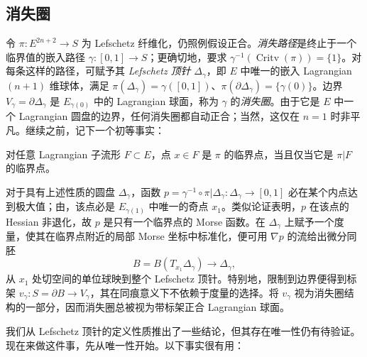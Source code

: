 \subsection{消失圈}\label{sec:16b}
令 $\pi:E^{2n+2}\to S$ 为 Lefschetz 纤维化，仍照例假设正合。\emph{消失路径}是终止于一个临界值的嵌入路径 $\gamma:[0,1]\to S$；更确切地，要求 $\gamma^{-1}(\operatorname{Critv}(\pi))=\{1\}$。对每条这样的路径，可赋予其 \emph{Lefschetz 顶针} $\Delta_\gamma$，即 $E$ 中唯一的嵌入 Lagrangian $(n+1)$ 维球体，满足 $\pi(\Delta_\gamma)=\gamma([0,1])$、$\pi(\partial\Delta_\gamma)=\{\gamma(0)\}$。边界 $V_\gamma=\partial\Delta_\gamma$ 是 $E_{\gamma(0)}$ 中的 Lagrangian 球面，称为 $\gamma$ 的\emph{消失圈}。由于它是 $E$ 中一个 Lagrangian 圆盘的边界，任何消失圈都自动正合；当然，这仅在 $n=1$ 时非平凡。继续之前，记下一个初等事实：

\begin{lemma}\label{st:16.2}
对任意 Lagrangian 子流形 $F\subset E$，点 $x\in F$ 是 $\pi$ 的临界点，当且仅当它是 $\pi|F$ 的临界点。
\end{lemma}

对于具有上述性质的圆盘 $\Delta_\gamma$，函数 $p=\gamma^{-1}\circ\pi|\Delta_\gamma:\Delta_\gamma\to[0,1]$ 必在某个内点达到极大值；由，该点必是 $E_{\gamma(1)}$ 中唯一的奇点 $x_1$。类似论证表明，$p$ 在该点的 Hessian 非退化，故 $p$ 是只有一个临界点的 Morse 函数。在 $\Delta_\gamma$ 上赋予一个度量，使其在临界点附近的局部 Morse 坐标中标准化，便可用 $\nabla p$ 的流给出微分同胚
\begin{equation}\label{eq:16.1}
B=B(T_{x_1}\Delta_\gamma)\longrightarrow\Delta_\gamma,
\end{equation}
从 $x_1$ 处切空间的单位球映到整个 Lefschetz 顶针。特别地，限制到边界便得到标架 $v_\gamma:S=\partial B\to V_\gamma$，其在同痕意义下不依赖于度量的选择。将 $v_\gamma$ 视为消失圈结构的一部分，因而消失圈总被视为带标架正合 Lagrangian 球面。

我们从 Lefschetz 顶针的定义性质推出了一些结论，但其存在唯一性仍有待验证。现在来做这件事，先从唯一性开始。以下事实很有用：

